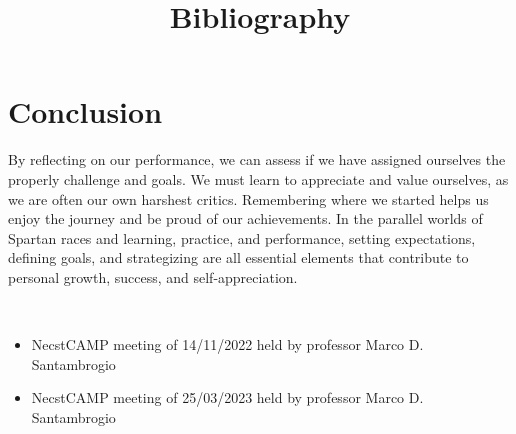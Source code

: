 \documentclass[12pt,oneside,a4paper]{article}
\begin{document}
\section{Conclusion} \label{sec:concl}
By reflecting on our performance, we can assess if we have assigned ourselves the properly challenge and goals. We must learn to appreciate and value ourselves, as we are often our own harshest critics. Remembering where we started helps us enjoy the journey and be proud of our achievements. In the parallel worlds of Spartan races and learning, practice, and performance, setting expectations, defining goals, and strategizing are all essential elements that contribute to personal growth, success, and self-appreciation.
\newpage
\title{\textbf{Bibliography}} \\
\begin{itemize}
\item NecstCAMP meeting of 14/11/2022 held by professor Marco D. Santambrogio
\item NecstCAMP meeting of 25/03/2023 held by professor Marco D. Santambrogio
\end{itemize}
\end{document}
